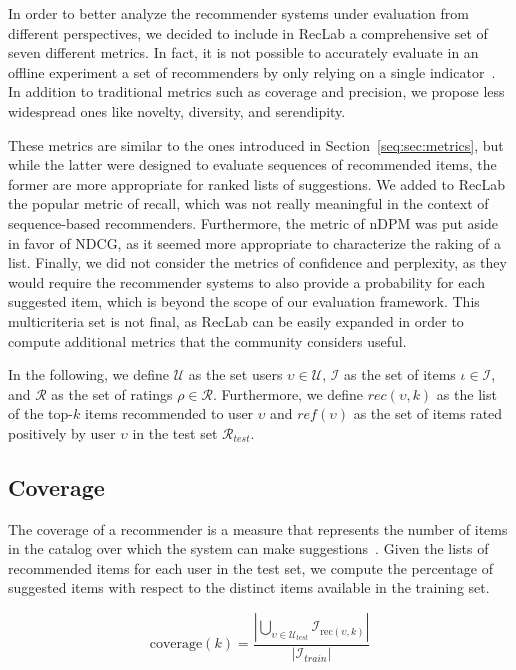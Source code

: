 In order to better analyze the recommender systems under evaluation from different perspectives, we decided to include in RecLab a comprehensive set of seven different metrics. In fact, it is not possible to accurately evaluate in an offline experiment a set of recommenders by only relying on a single indicator~\cite{Herlocker2004}. In addition to traditional metrics such as coverage and precision, we propose less widespread ones like novelty, diversity, and serendipity.

These metrics are similar to the ones introduced in Section~\ref{seq:sec:metrics}, but while the latter were designed to evaluate sequences of recommended items, the former are more appropriate for ranked lists of suggestions. We added to RecLab the popular metric of recall, which was not really meaningful in the context of sequence-based recommenders. Furthermore, the metric of nDPM was put aside in favor of NDCG, as it seemed more appropriate to characterize the raking of a list. Finally, we did not consider the metrics of confidence and perplexity, as they would require the recommender systems to also provide a probability for each suggested item, which is beyond the scope of our evaluation framework. This multicriteria set is not final, as RecLab can be easily expanded in order to compute additional metrics that the community considers useful.

In the following, we define $\mathcal{U}$ as the set users $\upsilon \in \mathcal{U}$, $\mathcal{I}$ as the set of items $\iota \in \mathcal{I}$, and $\mathcal{R}$ as the set of ratings $\rho \in \mathcal{R}$. Furthermore, we define $rec(\upsilon, k)$ as the list of the top-$k$ items recommended to user $\upsilon$ and $ref(\upsilon)$ as the set of items rated positively by user $\upsilon$ in the test set $\mathcal{R}_{test}$.

\subsection{Coverage}
The coverage of a recommender is a measure that represents the number of items in the catalog over which the system can make suggestions~\cite{Gunawardana2015}. Given the lists of recommended items for each user in the test set, we compute the percentage of suggested items with respect to the distinct items available in the training set.

\begin{equation*}
\mathrm{coverage}(k) = \frac{|\bigcup_{\upsilon \in \mathcal{U}_{test}} \mathcal{I}_{\mathrm{rec}(\upsilon, k)}|}{|\mathcal{I}_{train}|}
\end{equation*}

